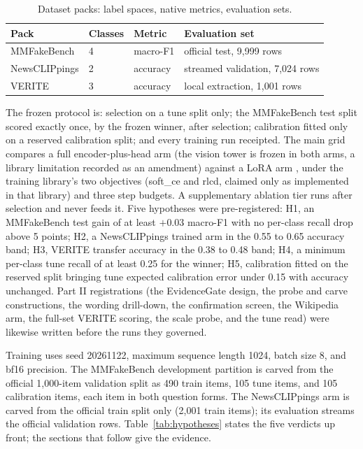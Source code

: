 \documentclass[conference]{IEEEtran}
\begin{document}
\begin{table}[t]
\centering
\caption{Dataset packs: label spaces, native metrics, evaluation sets.}
\label{tab:packs}
\begin{tabular}{llll}
\toprule
Pack & Classes & Metric & Evaluation set \\
\midrule
MMFakeBench & 4 & macro-F1 & official test, 9,999 rows \\
NewsCLIPpings & 2 & accuracy & streamed validation, 7,024 rows \\
VERITE & 3 & accuracy & local extraction, 1,001 rows \\
\bottomrule
\end{tabular}
\end{table}

The frozen protocol is: selection on a tune split only; the MMFakeBench test split scored exactly once, by the frozen winner, after selection; calibration fitted only on a reserved calibration split; and every training run receipted. The main grid compares a full encoder-plus-head arm (the vision tower is frozen in both arms, a library limitation recorded as an amendment) against a LoRA arm \cite{Hu2021LoraLowrank}, under the training library's two objectives (soft\_ce and rlcd, claimed only as implemented in that library) and three step budgets. A supplementary ablation tier runs after selection and never feeds it. Five hypotheses were pre-registered: H1, an MMFakeBench test gain of at least $+0.03$ macro-F1 with no per-class recall drop above 5 points; H2, a NewsCLIPpings trained arm in the 0.55 to 0.65 accuracy band; H3, VERITE transfer accuracy in the 0.38 to 0.48 band; H4, a minimum per-class tune recall of at least 0.25 for the winner; H5, calibration fitted on the reserved split bringing tune expected calibration error under 0.15 with accuracy unchanged. Part II registrations (the EvidenceGate design, the probe and carve constructions, the wording drill-down, the confirmation screen, the Wikipedia arm, the full-set VERITE scoring, the scale probe, and the tune read) were likewise written before the runs they governed.

Training uses seed 20261122, maximum sequence length 1024, batch size 8, and bf16 precision. The MMFakeBench development partition is carved from the official 1,000-item validation split as 490 train items, 105 tune items, and 105 calibration items, each item in both question forms. The NewsCLIPpings arm is carved from the official train split only (2,001 train items); its evaluation streams the official validation rows. Table~\ref{tab:hypotheses} states the five verdicts up front; the sections that follow give the evidence.
\end{document}
